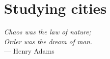 \chapter{Studying cities}
\label{chap:studying_cities}

\begin{flushright}{\slshape    
Chaos was the law of nature;\\
Order was the dream of man.} \\ \medskip
--- Henry Adams~\cite{Adams:1990}
\end{flushright}

\bigskip



